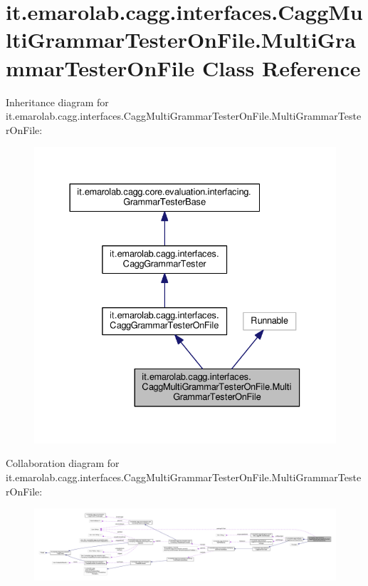 \hypertarget{classit_1_1emarolab_1_1cagg_1_1interfaces_1_1CaggMultiGrammarTesterOnFile_1_1MultiGrammarTesterOnFile}{\section{it.\-emarolab.\-cagg.\-interfaces.\-Cagg\-Multi\-Grammar\-Tester\-On\-File.\-Multi\-Grammar\-Tester\-On\-File Class Reference}
\label{classit_1_1emarolab_1_1cagg_1_1interfaces_1_1CaggMultiGrammarTesterOnFile_1_1MultiGrammarTesterOnFile}
}


Inheritance diagram for it.\-emarolab.\-cagg.\-interfaces.\-Cagg\-Multi\-Grammar\-Tester\-On\-File.\-Multi\-Grammar\-Tester\-On\-File\-:\nopagebreak
\begin{figure}[H]
\begin{center}
\leavevmode
\includegraphics[width=333pt]{classit_1_1emarolab_1_1cagg_1_1interfaces_1_1CaggMultiGrammarTesterOnFile_1_1MultiGrammarTesterOnFile__inherit__graph}
\end{center}
\end{figure}


Collaboration diagram for it.\-emarolab.\-cagg.\-interfaces.\-Cagg\-Multi\-Grammar\-Tester\-On\-File.\-Multi\-Grammar\-Tester\-On\-File\-:\nopagebreak
\begin{figure}[H]
\begin{center}
\leavevmode
\includegraphics[width=350pt]{classit_1_1emarolab_1_1cagg_1_1interfaces_1_1CaggMultiGrammarTesterOnFile_1_1MultiGrammarTesterOnFile__coll__graph}
\end{center}
\end{figure}
